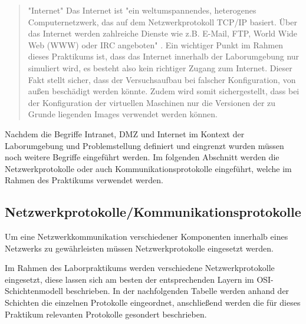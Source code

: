 \documentclass[
a4paper,     %
 headsepline, %
footsepline, %
titlepage,   %
 halfparskip,     %
 fleqn,       %
12pt         %
]{scrartcl}  %
\begin{document}
\begin{quotation}
\item["Internet"]
Das Internet ist "ein weltumspannendes, heterogenes Computernetzwerk, das auf dem Netzwerkprotokoll TCP/IP basiert. Über das Internet werden zahlreiche Dienste wie z.B. E-Mail, FTP, World Wide Web (WWW) oder IRC angeboten" \cite{Gab-Internet}. Ein wichtiger Punkt im Rahmen dieses Praktikums ist, dass das Internet innerhalb der Laborumgebung nur simuliert wird, es besteht also kein richtiger Zugang zum Internet. Dieser Fakt stellt sicher, dass der Versuchsaufbau bei falscher Konfiguration, von außen beschädigt werden könnte. Zudem wird somit sichergestellt, dass bei der Konfiguration der virtuellen Maschinen nur die Versionen der zu Grunde liegenden Images verwendet werden können. 

\end{quotation}

Nachdem die Begriffe Intranet, DMZ und Internet im Kontext der Laborumgebung und Problemstellung definiert und eingrenzt wurden müssen noch weitere Begriffe eingeführt werden. Im folgenden Abschnitt werden die Netzwerkprotokolle oder auch Kommunikationsprotokolle eingeführt, welche im Rahmen des Praktikums verwendet werden. 

\subsection{Netzwerkprotokolle/Kommunikationsprotokolle} 
Um eine Netzwerkkommunikation verschiedener Komponenten innerhalb eines Netzwerks zu gewährleisten müssen Netzwerkprotokolle eingesetzt werden. 

Im Rahmen des Laborpraktikums werden verschiedene Netzwerkprotokolle eingesetzt, diese lassen sich am besten der entsprechenden Layern im OSI-Schichtenmodell beschrieben. 
In der nachfolgenden Tabelle werden anhand der Schichten die einzelnen Protokolle eingeordnet, anschließend werden die für dieses Praktikum relevanten Protokolle gesondert beschrieben. 
\end{document}
